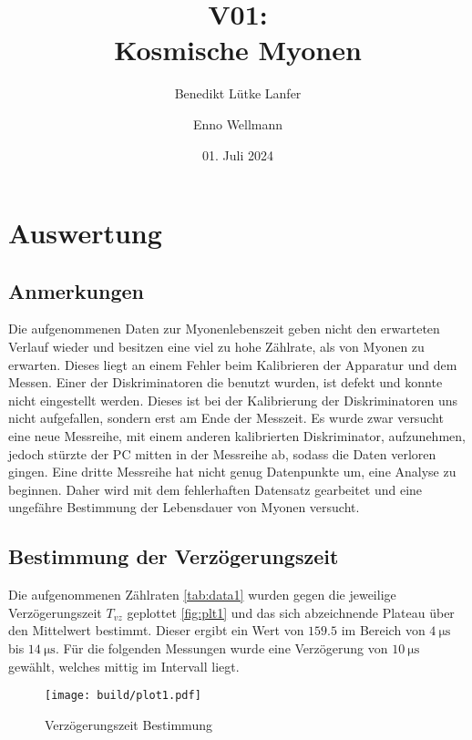 

\title{V01:\\ Kosmische Myonen}
\author{Benedikt Lütke Lanfer \and Enno Wellmann}
\date{01. Juli 2024}
\publishers{TU Dortmund – Fakultät Physik}



\tableofcontents
\newpage



\section{Auswertung}
\subsection{Anmerkungen}
Die aufgenommenen Daten zur Myonenlebenszeit geben nicht den erwarteten Verlauf wieder und besitzen eine viel zu hohe Zählrate, als von Myonen zu erwarten.
Dieses liegt an einem Fehler beim Kalibrieren der Apparatur und dem Messen. 
Einer der Diskriminatoren die benutzt wurden, ist defekt und konnte nicht eingestellt werden. 
Dieses ist bei der Kalibrierung der Diskriminatoren uns nicht aufgefallen, sondern erst am Ende der Messzeit. 
Es wurde zwar versucht eine neue Messreihe, mit einem anderen kalibrierten Diskriminator, aufzunehmen, 
jedoch stürzte der PC mitten in der Messreihe ab, sodass die Daten verloren gingen. 
Eine dritte Messreihe hat nicht genug Datenpunkte um, eine Analyse zu beginnen. 
Daher wird mit dem fehlerhaften Datensatz gearbeitet und eine ungefähre Bestimmung der Lebensdauer von Myonen versucht.    

\subsection{Bestimmung der Verzögerungszeit}
Die aufgenommenen Zählraten \eqref{tab:data1} wurden gegen die jeweilige Verzögerungszeit $T_{vz}$ geplottet \eqref{fig:plt1} 
und das sich abzeichnende Plateau über den Mittelwert bestimmt. Dieser ergibt ein Wert von $\num{159.5}$ im Bereich von $\qty{4}{\us}$ bis $\qty{14}{\us}$.
Für die folgenden Messungen wurde eine Verzögerung von $\qty{10}{\us}$ gewählt, welches mittig im Intervall liegt. 

\begin{figure}[H]
	\centering
	\texttt{[image: build/plot1.pdf]}
	\caption{Verzögerungszeit Bestimmung}\label{fig:plt1}
\end{figure}

